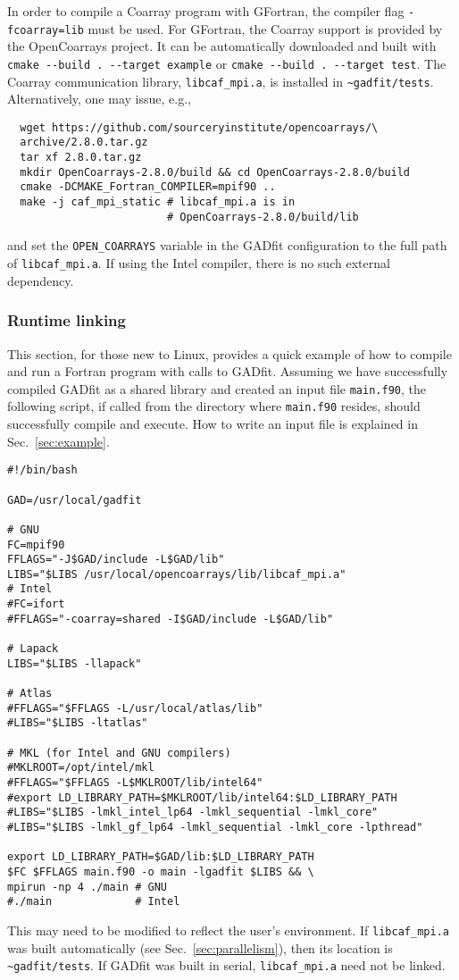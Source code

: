 \documentclass{article}
\begin{document}
In order to compile a Coarray program with GFortran, the compiler flag \texttt{-fcoarray=lib} must be used. For GFortran, the Coarray support is provided by the OpenCoarrays project. It can be automatically downloaded and built with \verb+cmake --build . --target example+ or \verb+cmake --build . --target test+. The Coarray communication library, \verb+libcaf_mpi.a+, is installed in \verb+~gadfit/tests+. Alternatively, one may issue, e.g.,
\begin{verbatim}
  wget https://github.com/sourceryinstitute/opencoarrays/\
  archive/2.8.0.tar.gz
  tar xf 2.8.0.tar.gz
  mkdir OpenCoarrays-2.8.0/build && cd OpenCoarrays-2.8.0/build
  cmake -DCMAKE_Fortran_COMPILER=mpif90 ..
  make -j caf_mpi_static # libcaf_mpi.a is in
                         # OpenCoarrays-2.8.0/build/lib
\end{verbatim}
and set the \verb+OPEN_COARRAYS+ variable in the GADfit configuration to the full path of \verb+libcaf_mpi.a+. If using the Intel compiler, there is no such external dependency.

\subsubsection{\label{sec:runtime}Runtime linking}

This section, for those new to Linux, provides a quick example of how to compile and run a Fortran program with calls to GADfit. Assuming we have successfully compiled GADfit as a shared library and created an input file \verb+main.f90+, the following script, if called from the directory where \verb+main.f90+ resides, should successfully compile and execute. How to write an input file is explained in Sec.~\ref{sec:example}.
\begin{verbatim}
#!/bin/bash

GAD=/usr/local/gadfit

# GNU
FC=mpif90
FFLAGS="-J$GAD/include -L$GAD/lib"
LIBS="$LIBS /usr/local/opencoarrays/lib/libcaf_mpi.a"
# Intel
#FC=ifort
#FFLAGS="-coarray=shared -I$GAD/include -L$GAD/lib"

# Lapack
LIBS="$LIBS -llapack"

# Atlas
#FFLAGS="$FFLAGS -L/usr/local/atlas/lib"
#LIBS="$LIBS -ltatlas"

# MKL (for Intel and GNU compilers)
#MKLROOT=/opt/intel/mkl
#FFLAGS="$FFLAGS -L$MKLROOT/lib/intel64"
#export LD_LIBRARY_PATH=$MKLROOT/lib/intel64:$LD_LIBRARY_PATH
#LIBS="$LIBS -lmkl_intel_lp64 -lmkl_sequential -lmkl_core"
#LIBS="$LIBS -lmkl_gf_lp64 -lmkl_sequential -lmkl_core -lpthread"

export LD_LIBRARY_PATH=$GAD/lib:$LD_LIBRARY_PATH
$FC $FFLAGS main.f90 -o main -lgadfit $LIBS && \
mpirun -np 4 ./main # GNU
#./main             # Intel
\end{verbatim}
This may need to be modified to reflect the user's environment. If \verb+libcaf_mpi.a+ was built automatically (see Sec.~\ref{sec:parallelism}), then its location is \verb+~gadfit/tests+. If GADfit was built in serial, \verb+libcaf_mpi.a+ need not be linked.
\end{document}
